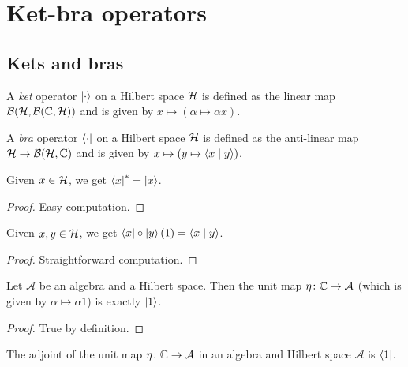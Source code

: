 \chapter{Ket-bra operators}

\section{Kets and bras}
\begin{definition}\label{ket}\leanok
  A \textit{ket} operator $\left\lvert\cdot\right\rangle$ on a Hilbert space $\mathcal{H}$ is defined as the linear map $\mathcal{B}(\mathcal{H},\mathcal{B}(\mathbb{C},\mathcal{H}))$ and is given by $x\mapsto(\alpha\mapsto\alpha x)$.
\end{definition}
\begin{definition}\label{bra}\leanok
  A \textit{bra} operator $\left\langle\cdot\right\rvert$ on a Hilbert space $\mathcal{H}$ is defined as the anti-linear map $\mathcal{H}\to\mathcal{B}(\mathcal{H},\mathbb{C})$ and is given by $x\mapsto(y\mapsto\left\langle x \mid y\right\rangle)$.
\end{definition}
\begin{lemma}\label{bra_adjoint_eq_ket}\leanok
  Given $x\in \mathcal{H}$, we get $\left\langle x\right\rvert^*=\left\lvert x\right\rangle$.
\end{lemma}
\begin{proof}\leanok
  Easy computation.
\end{proof}
\begin{corollary}\label{bra-ket}\leanok
  Given $x,y\in\mathcal{H}$, we get $\left\langle x\right\rvert\circ\left\lvert y\right\rangle(1)=\left\langle x \mid y\right\rangle$.
\end{corollary}
\begin{proof}\leanok
  Straightforward computation.
\end{proof}
\begin{corollary}\label{unit_eq_ket_one}
  \leanok
  Let $\mathcal{A}$ be an algebra and a Hilbert space. Then the unit map $\eta\colon\mathbb{C}\to\mathcal{A}$ (which is given by $\alpha\mapsto \alpha1$) is exactly $\left\lvert1\right\rangle$.
\end{corollary}
\begin{proof}\leanok
  True by definition.
\end{proof}
\begin{corollary}\label{unit_adjoint_eq_bra_one}\leanok
  The adjoint of the unit map $\eta\colon\mathbb{C}\to\mathcal{A}$ in an algebra and Hilbert space $\mathcal{A}$ is $\left\langle1\right\rvert$.
 \end{corollary}
